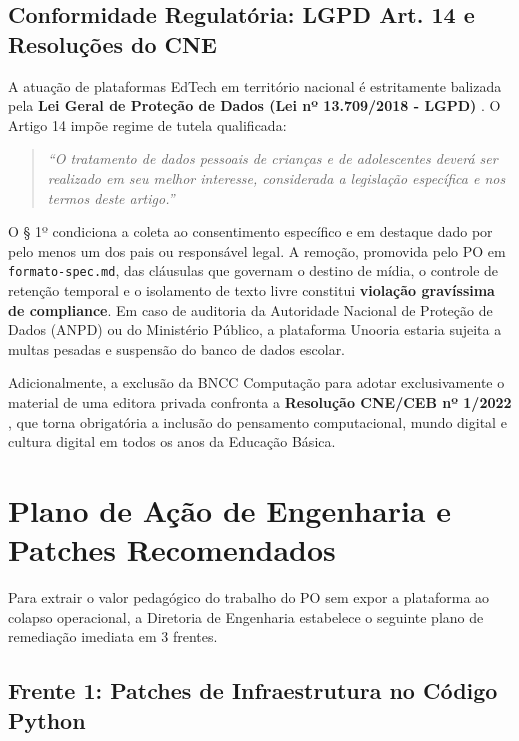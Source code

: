 \documentclass[11pt,a4paper]{article}
\begin{document}
\subsection{Conformidade Regulatória: LGPD Art. 14 e Resoluções do CNE}
A atuação de plataformas EdTech em território nacional é estritamente balizada pela \textbf{Lei Geral de Proteção de Dados (Lei nº 13.709/2018 - LGPD)} \cite{brasil2018lgpd}.
O Artigo 14 impõe regime de tutela qualificada:
\begin{quote}
\itshape ``O tratamento de dados pessoais de crianças e de adolescentes deverá ser realizado em seu melhor interesse, considerada a legislação específica e nos termos deste artigo.''
\end{quote}
O § 1º condiciona a coleta ao consentimento específico e em destaque dado por pelo menos um dos pais ou responsável legal. A remoção, promovida pelo PO em \texttt{formato-spec.md}, das cláusulas que governam o destino de mídia, o controle de retenção temporal e o isolamento de texto livre constitui \textbf{violação gravíssima de compliance}. Em caso de auditoria da Autoridade Nacional de Proteção de Dados (ANPD) ou do Ministério Público, a plataforma Unooria estaria sujeita a multas pesadas e suspensão do banco de dados escolar.

Adicionalmente, a exclusão da BNCC Computação para adotar exclusivamente o material de uma editora privada confronta a \textbf{Resolução CNE/CEB nº 1/2022} \cite{cne2022computacao}, que torna obrigatória a inclusão do pensamento computacional, mundo digital e cultura digital em todos os anos da Educação Básica.

\section{Plano de Ação de Engenharia e Patches Recomendados}

Para extrair o valor pedagógico do trabalho do PO sem expor a plataforma ao colapso operacional, a Diretoria de Engenharia estabelece o seguinte plano de remediação imediata em 3 frentes.

\subsection{Frente 1: Patches de Infraestrutura no Código Python}
\end{document}
